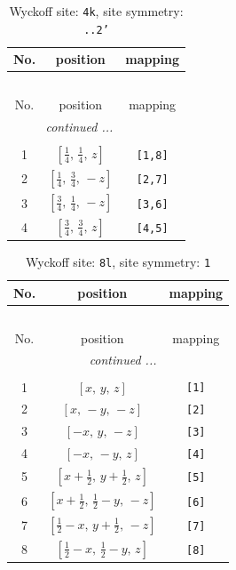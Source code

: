 \documentclass[fleqn,8pt]{jsarticle}
\begin{document}
\renewcommand{\arraystretch}{1.2}
\begin{longtable}{ccc}
\caption{Wyckoff site: {\tt 4k}, site symmetry: {\tt ..2'}}
 \\
 \hline \hline
No. & position & mapping \\ \hline \endfirsthead

\multicolumn{2}{l}{\tablename\ \thetable{}} \\
 \hline \hline
No. & position & mapping \\ \hline \endhead

 \hline \hline
\multicolumn{2}{r}{\footnotesize\it continued ...} \\ \endfoot

 \hline \hline
\multicolumn{2}{r}{} \\ \endlastfoot

1 & $\left[ \frac{1}{4},\, \frac{1}{4},\, z \right]$ & {\tt [1,8]} \\ \hline
2 & $\left[ \frac{1}{4},\, \frac{3}{4},\, - z \right]$ & {\tt [2,7]} \\ \hline
3 & $\left[ \frac{3}{4},\, \frac{1}{4},\, - z \right]$ & {\tt [3,6]} \\ \hline
4 & $\left[ \frac{3}{4},\, \frac{3}{4},\, z \right]$ & {\tt [4,5]} \\
\end{longtable}
\renewcommand{\arraystretch}{1.2}
\begin{longtable}{ccc}
\caption{Wyckoff site: {\tt 8l}, site symmetry: {\tt 1}}
 \\
 \hline \hline
No. & position & mapping \\ \hline \endfirsthead

\multicolumn{2}{l}{\tablename\ \thetable{}} \\
 \hline \hline
No. & position & mapping \\ \hline \endhead

 \hline \hline
\multicolumn{2}{r}{\footnotesize\it continued ...} \\ \endfoot

 \hline \hline
\multicolumn{2}{r}{} \\ \endlastfoot

1 & $\left[ x,\, y,\, z \right]$ & {\tt [1]} \\ \hline
2 & $\left[ x,\, - y,\, - z \right]$ & {\tt [2]} \\ \hline
3 & $\left[ - x,\, y,\, - z \right]$ & {\tt [3]} \\ \hline
4 & $\left[ - x,\, - y,\, z \right]$ & {\tt [4]} \\ \hline
5 & $\left[ x + \frac{1}{2},\, y + \frac{1}{2},\, z \right]$ & {\tt [5]} \\ \hline
6 & $\left[ x + \frac{1}{2},\, \frac{1}{2} - y,\, - z \right]$ & {\tt [6]} \\ \hline
7 & $\left[ \frac{1}{2} - x,\, y + \frac{1}{2},\, - z \right]$ & {\tt [7]} \\ \hline
8 & $\left[ \frac{1}{2} - x,\, \frac{1}{2} - y,\, z \right]$ & {\tt [8]} \\
\end{longtable}
\end{document}
